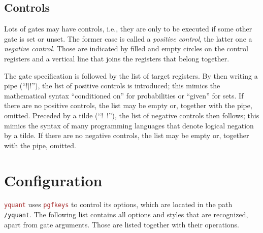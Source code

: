 \documentclass{scrartcl}
\def\pkg#1{\textcolor{brown}{\texttt{#1}}}
\def\Yquant{\pkg{yquant}}
\begin{document}
      \subsection{Controls}
         Lots of gates may have controls, i.e., they are only to be executed if some other gate is set or unset.
         The former case is called a \emph{positive control}, the latter one a \emph{negative control}.
         Those are indicated by filled and empty circles on the control registers and a vertical line that joins the registers that belong together.
         
         The gate specification is followed by the list of target registers.
         By then writing a pipe (``\yquant!|!''), the list of positive controls is introduced; this mimics the mathematical syntax ``conditioned on'' for probabilities or ``given'' for sets.
         If there are no positive controls, the list may be empty or, together with the pipe, omitted.
         Preceded by a tilde (``\yquant!~!''), the list of negative controls then follows; this mimics the syntax of many programming languages that denote logical negation by a tilde.
         If there are no negative controls, the list may be empty or, together with the pipe, omitted.
      
   \section{Configuration}\label{sec:config}
      \Yquant{} uses \pkg{pgfkeys} to control its options, which are located in the path \texttt{/yquant}.
      The following list contains all options and styles that are recognized, apart from gate arguments.
      Those are listed together with their operations.
      
\end{document}
